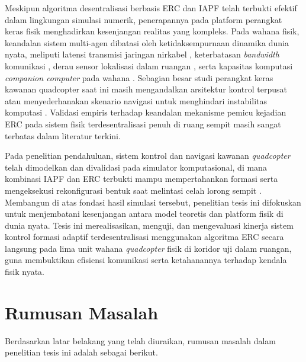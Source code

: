 \documentclass[12pt,a4paper]{report}
\begin{document}
Meskipun algoritma desentralisasi berbasis ERC dan IAPF telah terbukti efektif dalam lingkungan simulasi numerik, penerapannya pada platform perangkat keras fisik menghadirkan kesenjangan realitas yang kompleks. Pada wahana fisik, keandalan sistem multi-agen dibatasi oleh ketidaksempurnaan dinamika dunia nyata, meliputi latensi transmisi jaringan nirkabel \cite{veraamaroMeasurementInformedLatencyLimits2026}, keterbatasan \textit{bandwidth} komunikasi \cite{baktayanComputationalOffloadingUAV2024}, derau sensor lokalisasi dalam ruangan \cite{georgiadisReviewLocalizationSensing2025, liuSurveySensorsBased2025}, serta kapasitas komputasi \textit{companion computer} pada wahana \cite{ahmedSurveyUAVComputing2022}. Sebagian besar studi perangkat keras kawanan quadcopter saat ini masih mengandalkan arsitektur kontrol terpusat atau menyederhanakan skenario navigasi untuk menghindari instabilitas komputasi \cite{alqudsiUAVSwarmsResearch2025}. Validasi empiris terhadap keandalan mekanisme pemicu kejadian ERC pada sistem fisik terdesentralisasi penuh di ruang sempit masih sangat terbatas dalam literatur terkini.

Pada penelitian pendahuluan, sistem kontrol dan navigasi kawanan \textit{quadcopter} telah dimodelkan dan divalidasi pada simulator komputasional, di mana kombinasi IAPF dan ERC terbukti mampu mempertahankan formasi serta mengeksekusi rekonfigurasi bentuk saat melintasi celah lorong sempit \cite{herdianDecentralizedFormationControl2026}. Membangun di atas fondasi hasil simulasi tersebut, penelitian tesis ini difokuskan untuk menjembatani kesenjangan antara model teoretis dan platform fisik di dunia nyata. Tesis ini merealisasikan, menguji, dan mengevaluasi kinerja sistem kontrol formasi adaptif terdesentralisasi menggunakan algoritma ERC secara langsung pada lima unit wahana \textit{quadcopter} fisik di koridor uji dalam ruangan, guna membuktikan efisiensi komunikasi serta ketahanannya terhadap kendala fisik nyata.

\section{Rumusan Masalah}
Berdasarkan latar belakang yang telah diuraikan, rumusan masalah dalam penelitian tesis ini adalah sebagai berikut.
\end{document}
